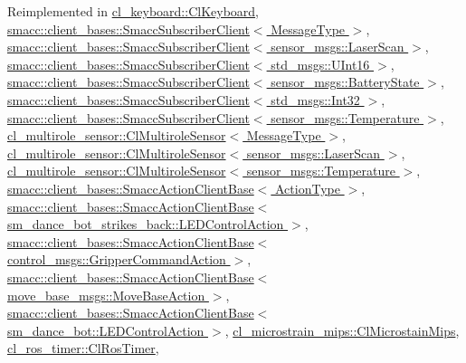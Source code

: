 Reimplemented in \hyperlink{classcl__keyboard_1_1ClKeyboard_af7f7fd9871ef5fcca400cd59d7b60775}{cl\+\_\+keyboard\+::\+Cl\+Keyboard}, \hyperlink{classsmacc_1_1client__bases_1_1SmaccSubscriberClient_af188f0f5e89de26a07e1f964cdd23a70}{smacc\+::client\+\_\+bases\+::\+Smacc\+Subscriber\+Client$<$ Message\+Type $>$}, \hyperlink{classsmacc_1_1client__bases_1_1SmaccSubscriberClient_af188f0f5e89de26a07e1f964cdd23a70}{smacc\+::client\+\_\+bases\+::\+Smacc\+Subscriber\+Client$<$ sensor\+\_\+msgs\+::\+Laser\+Scan $>$}, \hyperlink{classsmacc_1_1client__bases_1_1SmaccSubscriberClient_af188f0f5e89de26a07e1f964cdd23a70}{smacc\+::client\+\_\+bases\+::\+Smacc\+Subscriber\+Client$<$ std\+\_\+msgs\+::\+U\+Int16 $>$}, \hyperlink{classsmacc_1_1client__bases_1_1SmaccSubscriberClient_af188f0f5e89de26a07e1f964cdd23a70}{smacc\+::client\+\_\+bases\+::\+Smacc\+Subscriber\+Client$<$ sensor\+\_\+msgs\+::\+Battery\+State $>$}, \hyperlink{classsmacc_1_1client__bases_1_1SmaccSubscriberClient_af188f0f5e89de26a07e1f964cdd23a70}{smacc\+::client\+\_\+bases\+::\+Smacc\+Subscriber\+Client$<$ std\+\_\+msgs\+::\+Int32 $>$}, \hyperlink{classsmacc_1_1client__bases_1_1SmaccSubscriberClient_af188f0f5e89de26a07e1f964cdd23a70}{smacc\+::client\+\_\+bases\+::\+Smacc\+Subscriber\+Client$<$ sensor\+\_\+msgs\+::\+Temperature $>$}, \hyperlink{classcl__multirole__sensor_1_1ClMultiroleSensor_a3847e19f925f65dd034964eb2d0b3594}{cl\+\_\+multirole\+\_\+sensor\+::\+Cl\+Multirole\+Sensor$<$ Message\+Type $>$}, \hyperlink{classcl__multirole__sensor_1_1ClMultiroleSensor_a3847e19f925f65dd034964eb2d0b3594}{cl\+\_\+multirole\+\_\+sensor\+::\+Cl\+Multirole\+Sensor$<$ sensor\+\_\+msgs\+::\+Laser\+Scan $>$}, \hyperlink{classcl__multirole__sensor_1_1ClMultiroleSensor_a3847e19f925f65dd034964eb2d0b3594}{cl\+\_\+multirole\+\_\+sensor\+::\+Cl\+Multirole\+Sensor$<$ sensor\+\_\+msgs\+::\+Temperature $>$}, \hyperlink{classsmacc_1_1client__bases_1_1SmaccActionClientBase_a72967f255f85e35718a1e1b0b48c38ff}{smacc\+::client\+\_\+bases\+::\+Smacc\+Action\+Client\+Base$<$ Action\+Type $>$}, \hyperlink{classsmacc_1_1client__bases_1_1SmaccActionClientBase_a72967f255f85e35718a1e1b0b48c38ff}{smacc\+::client\+\_\+bases\+::\+Smacc\+Action\+Client\+Base$<$ sm\+\_\+dance\+\_\+bot\+\_\+strikes\+\_\+back\+::\+L\+E\+D\+Control\+Action $>$}, \hyperlink{classsmacc_1_1client__bases_1_1SmaccActionClientBase_a72967f255f85e35718a1e1b0b48c38ff}{smacc\+::client\+\_\+bases\+::\+Smacc\+Action\+Client\+Base$<$ control\+\_\+msgs\+::\+Gripper\+Command\+Action $>$}, \hyperlink{classsmacc_1_1client__bases_1_1SmaccActionClientBase_a72967f255f85e35718a1e1b0b48c38ff}{smacc\+::client\+\_\+bases\+::\+Smacc\+Action\+Client\+Base$<$ move\+\_\+base\+\_\+msgs\+::\+Move\+Base\+Action $>$}, \hyperlink{classsmacc_1_1client__bases_1_1SmaccActionClientBase_a72967f255f85e35718a1e1b0b48c38ff}{smacc\+::client\+\_\+bases\+::\+Smacc\+Action\+Client\+Base$<$ sm\+\_\+dance\+\_\+bot\+::\+L\+E\+D\+Control\+Action $>$}, \hyperlink{classcl__microstrain__mips_1_1ClMicrostainMips_ab52b739d8230f932ad3042fcd1b697f4}{cl\+\_\+microstrain\+\_\+mips\+::\+Cl\+Microstain\+Mips}, \hyperlink{classcl__ros__timer_1_1ClRosTimer_a874e97a9e3e974966ac4999e0a293e73}{cl\+\_\+ros\+\_\+timer\+::\+Cl\+Ros\+Timer}, 